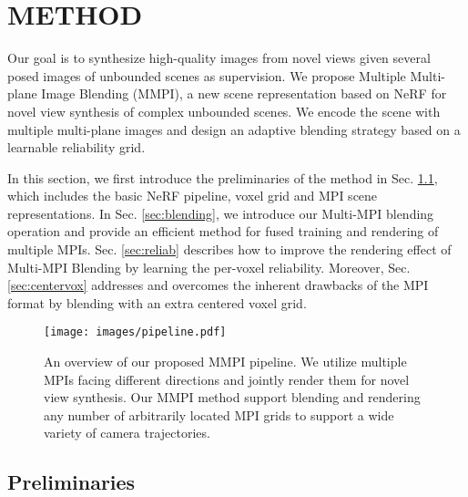 \documentclass[letterpaper, 10 pt, conference]{ieeeconf}  %
\begin{document}
\section{METHOD}

Our goal is to synthesize high-quality images from novel views given several posed images of unbounded scenes as supervision.
We propose Multiple Multi-plane Image Blending (MMPI), a new scene representation based on NeRF \cite{mildenhall2020nerf} for novel view synthesis of complex unbounded scenes. We encode the scene with multiple multi-plane images and design an adaptive blending strategy based on a learnable reliability grid. 

In this section, we first introduce the preliminaries of the method in Sec. \ref{sec:preliminaries}, which includes the basic NeRF pipeline, voxel grid and MPI scene representations. 
In Sec. \ref{sec:blending}, we introduce our Multi-MPI blending operation and provide an efficient method for fused training and rendering of multiple MPIs.
Sec. \ref{sec:reliab} describes how to improve the rendering effect of Multi-MPI Blending by learning the per-voxel reliability.
Moreover, Sec. \ref{sec:centervox} addresses and overcomes the inherent drawbacks of the MPI format by blending with an extra centered voxel grid.

\begin{figure}[th]
  \centering
  \texttt{[image: images/pipeline.pdf]}
  \caption{An overview of our proposed MMPI pipeline. We utilize multiple MPIs facing different directions and jointly render them for novel view synthesis. Our MMPI method support blending and rendering any number of arbitrarily located MPI grids to support a wide variety of camera trajectories.}
  \label{fig:pipeline}
\end{figure}

\subsection{Preliminaries} \label{sec:preliminaries}
\end{document}
